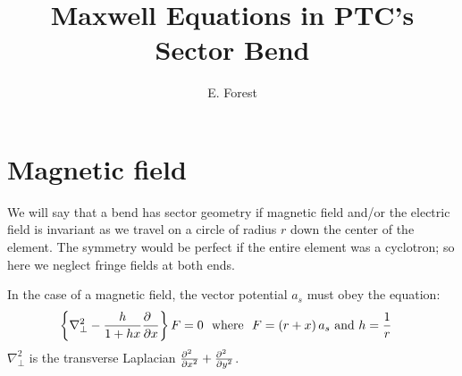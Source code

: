 \documentclass[11pt]{article} %
\title{Maxwell Equations  in PTC's Sector Bend}
\author{E. Forest}
\begin{document}
\maketitle

\section{Magnetic field}


We will say that a bend has sector geometry if magnetic field and/or the electric field is invariant as we travel on a circle of radius $r$ down the center of the
element. The symmetry would be perfect if the entire element was a cyclotron; so here we neglect fringe fields at both ends.

In the case of a magnetic field, the vector potential $a_s$ must obey the equation:
%
%
\begin{eqnarray}\left\{{{\nabla }_{\perp }^{2}-{h \over 1+hx}{\partial \hphantom{x} \over \partial x}}\right\}F&=0~~{\rm w}{\rm h}{\rm e}{\rm r}{\rm e}~~F=\left({r+x}\right){a}_{s}~{\rm a}{\rm n}{\rm d} ~h=
{1 \over r}\label{eq:maxb}\end{eqnarray}
%
%
%
${\nabla }_{\perp }^{2}$
is the transverse Laplacian %
${{\partial }^{2}\hphantom{x} \over {\partial x}^{2}}+{{\partial }^{2}\hphantom{x} \over {\partial y}^{2}}$.
\end{document}
